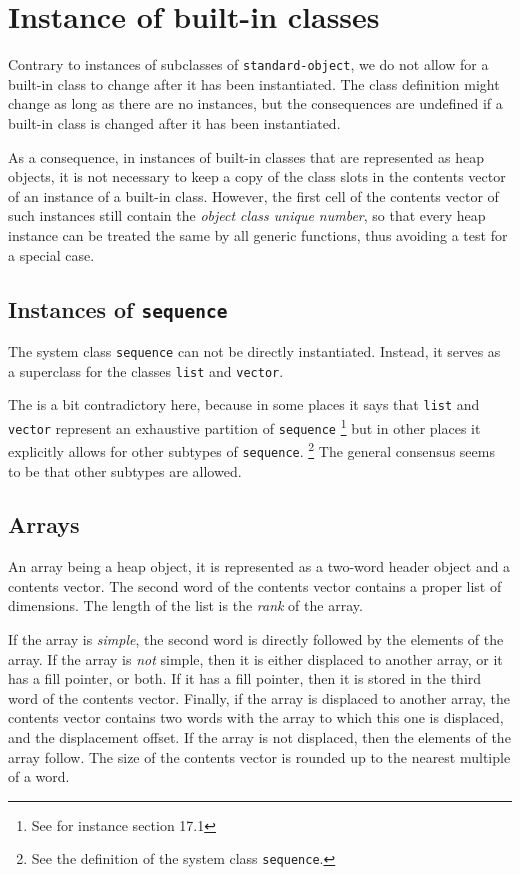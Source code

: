 \section{Instance of built-in classes}

Contrary to instances of subclasses of \texttt{standard-object}, we do
not allow for a built-in class to change after it has been
instantiated.  The class definition might change as long as there are
no instances, but the consequences are undefined if a built-in class
is changed after it has been instantiated.

As a consequence, in instances of built-in classes that are
represented as heap objects, it is not necessary to keep a copy of the
class slots in the contents vector of an instance of a built-in class.
However, the first cell of the contents vector of such instances still
contain the \emph{object class unique number}, so that every heap
instance can be treated the same by all generic functions, thus
avoiding a test for a special case.

\subsection{Instances of \texttt{sequence}}

The system class \texttt{sequence} can not be directly instantiated.
Instead, it serves as a superclass for the classes \texttt{list} and
\texttt{vector}.  

The \hs{} is a bit contradictory here, because
in some places it says that \texttt{list} and \texttt{vector}
represent an exhaustive partition of \texttt{sequence}%
\footnote{See for instance section 17.1}
but in other places it explicitly allows for other subtypes of
\texttt{sequence}.%
\footnote{See the definition of the system class \texttt{sequence}.}
The general consensus seems to be that other subtypes are allowed. 


\subsection{Arrays}
\label{sec-data-representation-arrays}

An array being a heap object, it is represented as a two-word header
object and a contents vector.  The second word of the contents vector
contains a proper list of dimensions.  The length of the list is the
\emph{rank} of the array.

If the array is \emph{simple}, the second word is directly followed
by the elements of the array.  If the array is \emph{not} simple, then
it is either displaced to another array, or it has a fill pointer, or
both.  If it has a fill pointer, then it is stored in the third word
of the contents vector.  Finally, if the array is displaced to another
array, the contents vector contains two words with the array to which
this one is displaced, and the displacement offset.  If the array is
not displaced, then the elements of the array follow.  The size of the
contents vector is rounded up to the nearest multiple of a word. 

